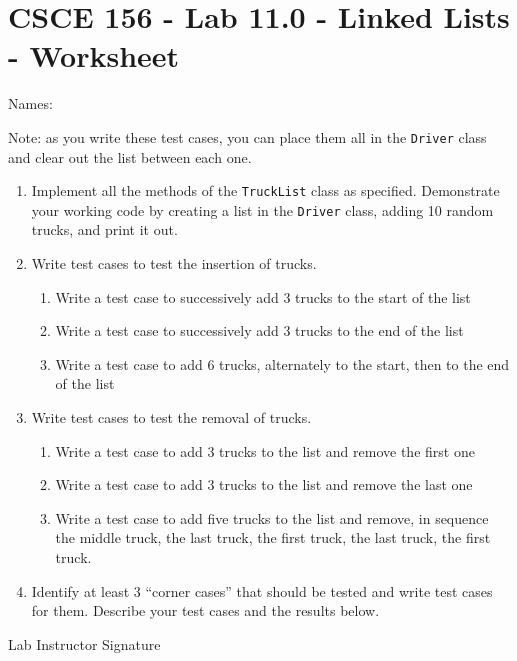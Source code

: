 \documentclass[12pt]{scrartcl}
\begin{document}
\section*{CSCE 156 - Lab 11.0 - Linked Lists - Worksheet}

Names: \underline{\hspace{10cm}}

Note: as you write these test cases, you can place them all 
in the \texttt{Driver} class and clear out the list 
between each one.

\begin{enumerate}
  \item Implement all the methods of the \texttt{TruckList} 
  class as specified.  Demonstrate your working code by creating a 
  list in the \texttt{Driver} class, adding 10 random 
  trucks, and print it out. 

  \item Write test cases to test the insertion of trucks.
  \begin{enumerate}
    \item Write a test case to successively add 3 trucks to 
    the start of the list
    \item Write a test case to successively add 3 trucks to 
    the end of the list
    \item Write a test case to add 6 trucks, alternately to 
    the start, then to the end of the list 
  \end{enumerate}

  \item Write test cases to test the removal of trucks.
  \begin{enumerate}
    \item Write a test case to add 3 trucks to the list and 
    remove the first one
    \item Write a test case to add 3 trucks to the list and 
    remove the last one
    \item Write a test case to add five trucks to the list 
    and remove, in sequence the middle truck, the last truck, 
    the first truck, the last truck, the first truck.
  \end{enumerate}

  \item Identify at least 3 ``corner cases'' that should be 
  tested and write test cases for them.  Describe your test 
  cases and the results below.
\end{enumerate}

Lab Instructor Signature\underline{\hspace{7.5cm}}
\end{document}
